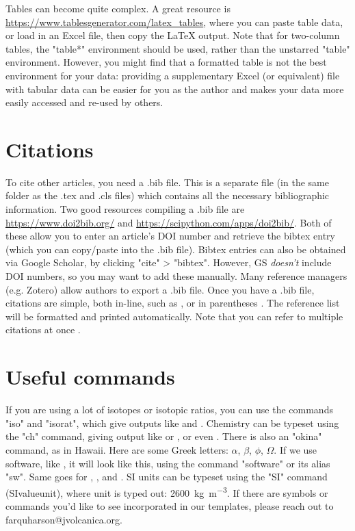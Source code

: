 \documentclass[draft, {\secondLanguage}, english]{VolcanicaStyle-production}
\begin{document}
Tables can become quite complex. A great resource is \url{https://www.tablesgenerator.com/latex_tables}, where you can paste table data, or load in an Excel file, then copy the LaTeX output. Note that for two-column tables, the "table*" environment should be used, rather than the unstarred "table" environment. However, you might find that a formatted table is not the best environment for your data: providing a supplementary Excel (or equivalent) file with tabular data can be easier for you as the author and makes your data more easily accessed and re-used by others.

\section{Citations}
To cite other articles, you need a .bib file. This is a separate file (in the same folder as the .tex and .cls files) which contains all the necessary bibliographic information. Two good resources compiling a .bib file are \url{https://www.doi2bib.org/} and \url{https://scipython.com/apps/doi2bib/}. Both of these allow you to enter an article's DOI number and retrieve the bibtex entry (which you can copy/paste into the .bib file). Bibtex entries can also be obtained via Google Scholar, by clicking "cite" > "bibtex". However, GS \emph{doesn't} include DOI numbers, so you may want to add these manually. Many reference managers (e.g. Zotero) allow authors to export a .bib file. Once you have a .bib file, citations are simple, both in-line, such as \textcite{Farquharson2018}, or in parentheses \parencite{Kavanagh2022}. The reference list will be formatted and printed automatically. Note that you can refer to multiple citations at once \parencite[e.g.][among others]{Kavanagh2022, Siebert2015}.

\section{Useful commands}

If you are using a lot of isotopes or isotopic ratios, you can use the commands "iso" and "isorat", which give outputs like  and . Chemistry can be typeset using the "ch" command, giving output like  or \ch{[AgCl2]-}, or even . There is also an "okina" command, as in Hawai{\okina}i. Here are some Greek letters: $\alpha$, $\beta$, $\phi$, $\Omega$. If we use software, like , it will look like this, using the command "software" or its alias "sw". Same goes for , , and . SI units can be typeset using the "SI" command (SI{value}{unit}), where  unit is typed out: \SI{2600}{\kilo\gram\per\meter\cubed}. If there are symbols or commands you'd like to see incorporated in our templates, please reach out to farquharson@jvolcanica.org.
\end{document}
